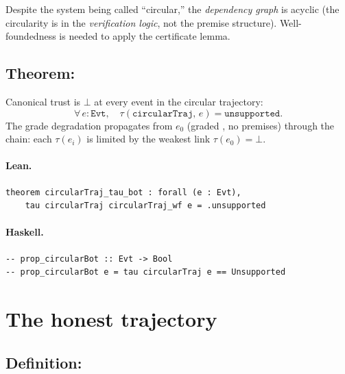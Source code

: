 \documentclass[11pt,a4paper]{article}
\begin{document}
\begin{fidelitynote}
Despite the system being called ``circular,'' the \emph{dependency graph} is
acyclic (the circularity is in the \emph{verification logic}, not the premise
structure).  Well-foundedness is needed to apply the certificate lemma.
\end{fidelitynote}


\subsection{Theorem: }

\begin{thm}
Canonical trust is $\bot$ at every event in the circular trajectory:
\[
  \forall\, e : \mathtt{Evt},\quad
  \tau(\mathtt{circularTraj},\, e) = \mathtt{unsupported}.
\]
The grade degradation propagates from $e_0$ (graded , no
premises) through the chain: each $\tau(e_i)$ is limited by the weakest link
$\tau(e_0) = \bot$.
\end{thm}

\paragraph{Lean.}
\begin{lstlisting}[style=lean]
theorem circularTraj_tau_bot : forall (e : Evt),
    tau circularTraj circularTraj_wf e = .unsupported
\end{lstlisting}

\paragraph{Haskell.}
\begin{lstlisting}[style=haskell]
-- prop_circularBot :: Evt -> Bool
-- prop_circularBot e = tau circularTraj e == Unsupported
\end{lstlisting}

\section{The honest trajectory}

\subsection{Definition: }
\end{document}
